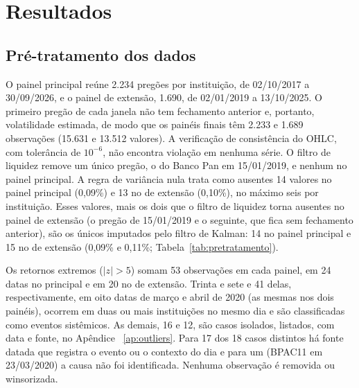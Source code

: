 \chapter{Resultados}
\label{cap:resultados}

\section{Pré-tratamento dos dados}
\label{sec:res-pretratamento}

O painel principal reúne 2.234 pregões por instituição, de 02/10/2017 a
30/09/2026, e o painel de extensão, 1.690, de 02/01/2019 a 13/10/2025. O
primeiro pregão de cada janela não tem fechamento anterior e, portanto,
volatilidade estimada, de modo que os painéis finais têm 2.233 e 1.689
observações (15.631 e 13.512 valores). A verificação de consistência do OHLC,
com tolerância de $10^{-6}$, não encontra violação em nenhuma série. O filtro
de liquidez remove um único pregão, o do Banco Pan em 15/01/2019, e nenhum no
painel principal. A regra de variância nula trata como ausentes 14 valores no
painel principal (0,09\%) e 13 no de extensão (0,10\%), no máximo seis por
instituição. Esses valores, mais os dois que o filtro de liquidez torna
ausentes no painel de extensão (o pregão de 15/01/2019 e o seguinte, que fica
sem fechamento anterior), são os únicos imputados pelo filtro de Kalman: 14 no
painel principal e 15 no de extensão (0,09\% e 0,11\%;
Tabela~\ref{tab:pretratamento}).

Os retornos extremos ($|z|>5$) somam 53 observações em cada painel, em 24
datas no principal e em 20 no de extensão. Trinta e sete e 41 delas,
respectivamente, em oito datas de março e abril de 2020 (as mesmas nos dois
painéis), ocorrem em duas ou mais instituições no mesmo dia e são
classificadas como eventos sistêmicos. As demais, 16 e 12, são casos isolados,
listados, com data e fonte, no Apêndice ~\ref{ap:outliers}. Para 17 dos 18 casos distintos há fonte datada
que registra o evento ou o contexto do dia e para um (BPAC11 em 23/03/2020) a causa não
foi identificada. Nenhuma observação é removida ou winsorizada.


